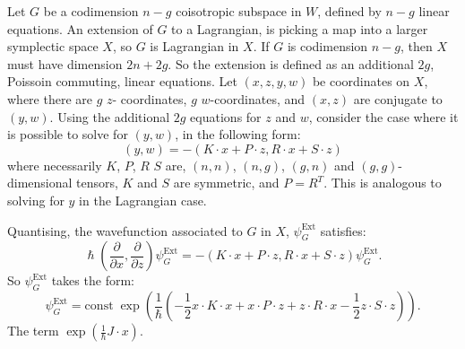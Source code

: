     Let \(G\) be a codimension \(n-g \) coisotropic subspace in \(W\), defined by \(n-g\) linear equations. An extension of \(G\) to a Lagrangian, is picking a map into a larger symplectic space \(X\), so \(G\) is Lagrangian in \(X\). If \(G\) is codimension \(n-g\), then 
    \(X\) must have dimension \(2n+2g\). So the extension is defined as  an additional \(2g\), Poissoin commuting, linear equations. Let \((x,z,y,w)\) be coordinates on \(X\), where there are \(g\) \(z\)- coordinates, \(g\) \(w\)-coordinates, and \((x,z)\) are conjugate to \((y,w)\). Using the additional \(2g\) equations for \(z\) and \(w\), consider the case where it is possible to solve for \((y,w)\), in the following form:
    \begin{equation}
    \label{eqn:solveforext}
    (y,w) = - (K \cdot x + P \cdot z  , R \cdot x + S \cdot z)
    \end{equation}
    where necessarily \(K\), \(P\), \(R\) \(S\) are, \((n,n)\), \( (n,g)\), \((g,n)\) and \((g,g)\)-dimensional tensors, \(K\) and \(S\) are symmetric, and \(P=R^T\). This is analogous to solving for \(y\) in the Lagrangian case.
    
    Quantising, the wavefunction associated to \(G\) in \(X\), \(\psi_G^{\text{Ext}}\) satisfies:
    \[  \hslash \left(\frac{\partial}{\partial x}, \frac{\partial }{\partial z} \right) \psi_G^{\text{Ext}} = - \left(K \cdot x + P \cdot z  , R \cdot x + S \cdot z\right) \psi_G^{\text{Ext}}.\]
    So \(\psi_G^{\text{Ext}}\) takes the form:
    \[ \psi_G^{\text{Ext}} = \mathrm{const} \; \exp\left( \frac{1}{\hslash} \left( -\frac{1}{2}  x \cdot K \cdot x + x \cdot P \cdot z + z \cdot R \cdot x  - \frac{1}{2} z \cdot S \cdot z \right) \right). \]
    The term \( \exp\left( \frac{1}{\hslash} J \cdot x \right) \).
    
    


